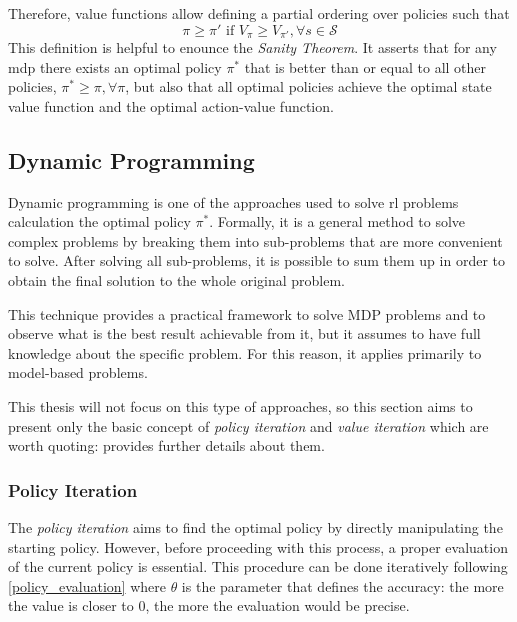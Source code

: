 Therefore, value functions allow defining a partial ordering over policies such that \[\pi \ge \pi' \text{ if } V_\pi \ge V_{\pi'},\forall s \in \mathcal{S}\]
This definition is helpful to enounce the \textit{Sanity Theorem}. It asserts that for any \acrshort{mdp} there exists an optimal policy $\pi^*$ that is better than or equal to all other policies, $\pi^* \ge \pi, \forall \pi$, but also that all optimal policies achieve the optimal state value function and the optimal action-value function.


\subsection{Dynamic Programming}

Dynamic programming is one of the approaches used to solve \acrshort{rl} problems calculation the optimal policy $\pi^*$. Formally, it is a general method to solve complex problems by breaking them into sub-problems that are more convenient to solve. After solving all sub-problems, it is possible to sum them up in order to obtain the final solution to the whole original problem.

This technique provides a practical framework to solve MDP problems and to observe what is the best result achievable from it, but it assumes to have full knowledge about the specific problem. For this reason, it applies primarily to model-based problems.

This thesis will not focus on this type of approaches, so this section aims to present only the basic concept of \textit{policy iteration} and \textit{value iteration} which are worth quoting: \cite[Chapter 4]{sutton2018reinforcement} provides further details about them.

\subsubsection{Policy Iteration}

The \textit{policy iteration} aims to find the optimal policy by directly manipulating the starting policy. However, before proceeding with this process, a proper evaluation of the current policy is essential. This procedure can be done iteratively following \vref{policy_evaluation} where $\theta$ is the parameter that defines the accuracy: the more the value is closer to $0$, the more the evaluation would be precise.

